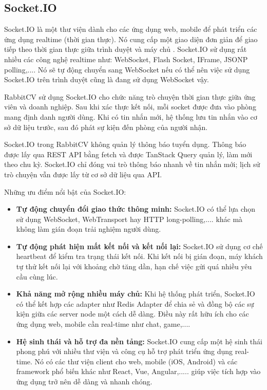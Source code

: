 \subsection{Socket.IO}

Socket.IO là một thư viện dành cho các ứng dụng web, mobile để phát triển các ứng dụng realtime (thời gian thực). Nó cung cấp một giao diện đơn giản để giao tiếp theo thời gian thực giữa trình duyệt và máy chủ \cite{socketiodocs}. Socket.IO sử dụng rất nhiều các công nghệ realtime như: WebSocket, Flash Socket, IFrame, JSONP polling,.... Nó sẽ tự động chuyển sang WebSocket nếu có thể nên việc sử dụng Socket.IO trên trình duyệt cũng là đang sử dụng WebSocket vậy.

RabbitCV sử dụng Socket.IO cho chức năng trò chuyện thời gian thực giữa ứng viên và doanh nghiệp. Sau khi xác thực kết nối, mỗi socket được đưa vào phòng mang định danh người dùng. Khi có tin nhắn mới, hệ thống lưu tin nhắn vào cơ sở dữ liệu trước, sau đó phát sự kiện đến phòng của người nhận.

Socket.IO trong RabbitCV không quản lý thông báo tuyển dụng. Thông báo được lấy qua REST API bằng fetch và được TanStack Query quản lý, làm mới theo chu kỳ. Socket.IO chỉ đóng vai trò thông báo nhanh về tin nhắn mới; lịch sử trò chuyện vẫn được lấy từ cơ sở dữ liệu qua API.

Những ưu điểm nổi bật của Socket.IO:

\begin{itemize}
    \item \textbf{Tự động chuyển đổi giao thức thông minh:} Socket.IO có thể lựa chọn sử dụng WebSocket, WebTransport hay HTTP long-polling,.... khác mà không làm gián đoạn trải nghiệm người dùng.
    \item \textbf{Tự động phát hiện mất kết nối và kết nối lại:} Socket.IO sử dụng cơ chế heartbeat để kiểm tra trạng thái kết nối. Khi kết nối bị gián đoạn, máy khách tự thử kết nối lại với khoảng chờ tăng dần, hạn chế việc gửi quá nhiều yêu cầu cùng lúc.
    \item \textbf{Khả năng mở rộng nhiều máy chủ:} Khi hệ thống phát triển, Socket.IO có thể kết hợp các adapter như Redis Adapter để chia sẻ và đồng bộ các sự kiện giữa các server node một cách dễ dàng. Điều này rất hữu ích cho các ứng dụng web, mobile cần real-time như chat, game,....
    \item \textbf{Hệ sinh thái và hỗ trợ đa nền tảng:} Socket.IO cung cấp một hệ sinh thái phong phú với nhiều thư viện và công cụ hỗ trợ phát triển ứng dụng real-time. Nó có các thư viện client cho web, mobile (iOS, Android) và các framework phổ biến khác như React, Vue, Angular,..... giúp việc tích hợp vào ứng dụng trở nên dễ dàng và nhanh chóng.
\end{itemize}

